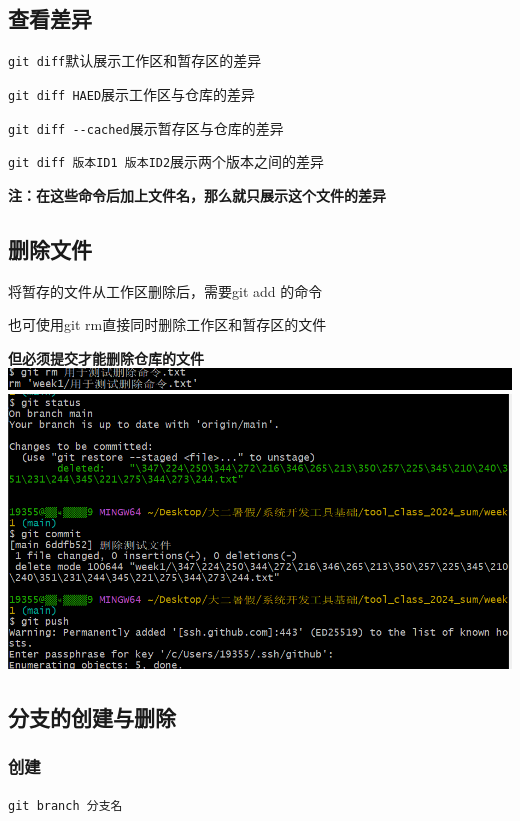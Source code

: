 \documentclass[UTF8,a4paper]{ctexart}
\begin{document}
\subsection{查看差异}
\verb|git diff|\quad 默认展示工作区和暂存区的差异\par
\verb|git diff HAED|\quad 展示工作区与仓库的差异\par
\verb|git diff --cached|\quad 展示暂存区与仓库的差异\par
\verb|git diff 版本ID1 版本ID2|\quad 展示两个版本之间的差异\par
\textbf{注：在这些命令后加上文件名，那么就只展示这个文件的差异}

\subsection{删除文件}
将暂存的文件从工作区删除后，需要git add 的命令\par
也可使用git rm直接同时删除工作区和暂存区的文件\par
\textbf{但必须提交才能删除仓库的文件}\\
\includegraphics[width=1\textwidth]{rm1.png}\\
\includegraphics[width=1\textwidth]{rm2.png}

\subsection{分支的创建与删除}
\subsubsection{创建}
\verb|git branch 分支名|\par
\end{document}
